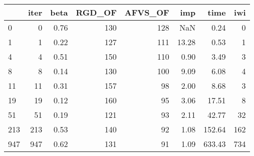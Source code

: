 \begin{tabular}{lrrrrrrr}
\toprule
{} &  iter &  beta &  RGD\_OF &  AFVS\_OF &   imp &   time &  iwi \\
\midrule
0   &     0 &  0.76 &     130 &      128 &   NaN &   0.24 &    0 \\
1   &     1 &  0.22 &     127 &      111 & 13.28 &   0.53 &    1 \\
4   &     4 &  0.51 &     150 &      110 &  0.90 &   3.49 &    3 \\
8   &     8 &  0.14 &     130 &      100 &  9.09 &   6.08 &    4 \\
11  &    11 &  0.31 &     157 &       98 &  2.00 &   8.68 &    3 \\
19  &    19 &  0.12 &     160 &       95 &  3.06 &  17.51 &    8 \\
51  &    51 &  0.19 &     121 &       93 &  2.11 &  42.77 &   32 \\
213 &   213 &  0.53 &     140 &       92 &  1.08 & 152.64 &  162 \\
947 &   947 &  0.62 &     131 &       91 &  1.09 & 633.43 &  734 \\
\bottomrule
\end{tabular}
